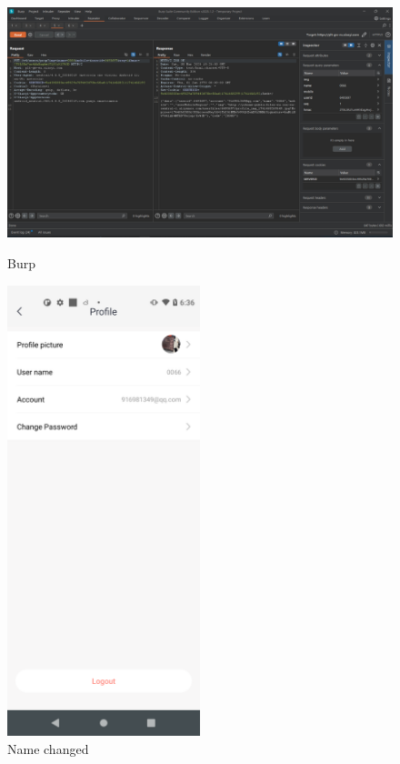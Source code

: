 \documentclass[11pt]{article}
\begin{document}
\begin{figure}[htbp]
    \centering
    \begin{minipage}[b]{0.49\textwidth}
      \centering
      \includegraphics[width=1\textwidth]{imgs/BURP.png}
      \caption{Burp}
      \label{Burp}
    \end{minipage}
    \hfill
    \begin{minipage}[b]{0.49\textwidth}
      \centering
      \includegraphics[width=0.5\textwidth]{imgs/name_changed.png}
      \caption{Name changed}
      \label{Name changed}
    \end{minipage}
  \end{figure}
\end{document}
